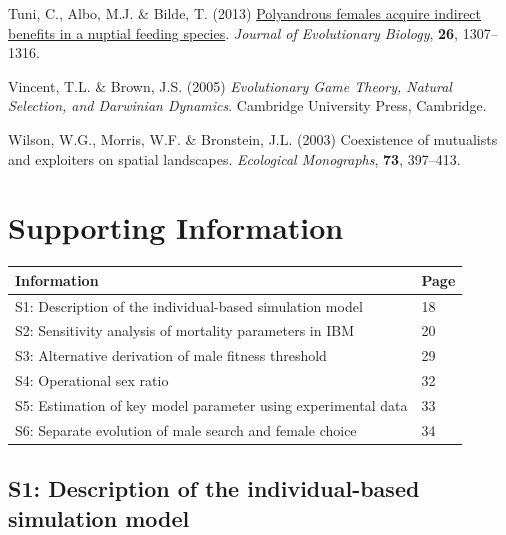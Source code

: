 \documentclass[
]{article}
\newlength{\cslhangindent}
\newlength{\cslentryspacingunit} %
\newenvironment{CSLReferences}[2] %
 {%
  \setlength{\parindent}{0pt}
  \ifodd #1
  \let\oldpar\par
  \def\par{\hangindent=\cslhangindent\oldpar}
  \fi
  \setlength{\parskip}{#2\cslentryspacingunit}
 }%
 {}
\begin{document}
\begin{CSLReferences}{0}{0}
\leavevmode{}%
Tuni, C., Albo, M.J. \& Bilde, T. (2013)
\href{https://doi.org/10.1111/jeb.12137}{{Polyandrous females acquire
indirect benefits in a nuptial feeding species}}. \emph{Journal of
Evolutionary Biology}, \textbf{26}, 1307--1316.

\leavevmode{}%
Vincent, T.L. \& Brown, J.S. (2005) \emph{{Evolutionary Game Theory,
Natural Selection, and Darwinian Dynamics}}. Cambridge University Press,
Cambridge.

\leavevmode{}%
Wilson, W.G., Morris, W.F. \& Bronstein, J.L. (2003) {Coexistence of
mutualists and exploiters on spatial landscapes}. \emph{Ecological
Monographs}, \textbf{73}, 397--413.

\end{CSLReferences}

\clearpage

\hypertarget{supporting-information}{%
\section{Supporting Information}\label{supporting-information}}

\begin{longtable}[]{@{}ll@{}}
\toprule
Information & Page \\
\midrule
\endhead
S1: Description of the individual-based simulation model & 18 \\
S2: Sensitivity analysis of mortality parameters in IBM & 20 \\
S3: Alternative derivation of male fitness threshold & 29 \\
S4: Operational sex ratio & 32 \\
S5: Estimation of key model parameter using experimental data & 33 \\
S6: Separate evolution of male search and female choice & 34 \\
\bottomrule
\end{longtable}

\clearpage

\hypertarget{s1-description-of-the-individual-based-simulation-model}{%
\subsection{S1: Description of the individual-based simulation
model}\label{s1-description-of-the-individual-based-simulation-model}}
\end{document}
